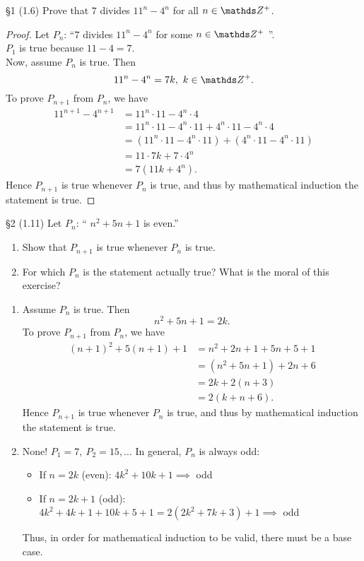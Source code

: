 \documentclass{homework}
\begin{document}
\begin{problem}{\S 1} (1.6)
   Prove that $7$ divides $11^{n}-4^{n}$ for all $n\in \Z^{+}$.
\end{problem}
\begin{proof}[Proof]
  Let $P_n$: ``$7$ divides $11^{n}-4^{n}$ for some $n\in \Z^{+}$ ''. \\
  $ P_1$ is true because $11-4=7$.\\
  Now, assume  $P_n$ is true. Then  \[
  11^{n}-4^{n} = 7k,\ k\in \Z^{+}
.\] To prove $P_{n+1}$ from $P_n$, we have
 \begin{align*}
  11^{n+1}-4^{n+1} &= 11^{n}\cdot 11-4^{n}\cdot 4 \\
  &= 11^{n}\cdot 11-4^{n}\cdot 11+4^{n}\cdot 11-4^{n}\cdot 4 \\
  &= \left( 11^{n}\cdot 11-4^{n}\cdot 11 \right) +\left( 4^{n}\cdot 11-4^{n}\cdot 11 \right)  \\
  &= 11\cdot 7k+7\cdot 4^{n} \\
  &= 7\left( 11k+4^{n} \right)
.\end{align*} Hence $P_{n+1}$ is true whenever $P_n$ is true, and thus by mathematical induction the
statement is true.
\end{proof}

\begin{problem}{\S 2}
  (1.11) Let $P_n$: `` $n^2+5n+1$ is even.''
  \begin{enumerate}[label=(\alph*)]
    \item Show that $P_{n+1}$ is true whenever  $P_n$ is true.
    \item For which  $P_n$ is the statement actually true? What is the moral of this exercise?
  \end{enumerate}
\end{problem}
\begin{solution}
  \begin{enumerate}[label=(\alph*)]
    \item Assume $P_n$ is true. Then  \[
    n^2+5n+1=2k
  .\] To prove $P_{n+1}$ from  $P_n$, we have
  \begin{align*}
    (n+1)^2+5(n+1)+1 &= n^2+2n+1+5n+5+1 \\
                     &= (n^2+5n+1)+2n+6 \\
                     &= 2k+2(n+3) \\
                     &= 2(k+n+6)
                   .\end{align*}
     Hence $P_{n+1}$ is true whenever  $P_n$ is true, and thus by
     mathematical induction the statement is true. 
   \item None! $ P_1=7,\ P_2=15,\ldots$ In general, $P_n$ is always odd:
      \begin{itemize}
        \item If $n=2k$ (even): $4k^2+10k+1 \implies$ odd
        \item If $n=2k+1$ (odd):  $4k^2+4k+1+10k+5+1=2(2k^2+7k+3)+1 \implies$ odd
     \end{itemize}
    Thus, in order for mathematical induction to be valid, there must be a base case.
  \end{enumerate}
\end{solution}
\end{document}
